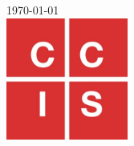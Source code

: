 \begin{titlepage}


{\large \today}\\[2cm] %


\includegraphics[width=4cm, height=4cm]{logo.jpg}\\[1cm] %
 


\end{titlepage}


